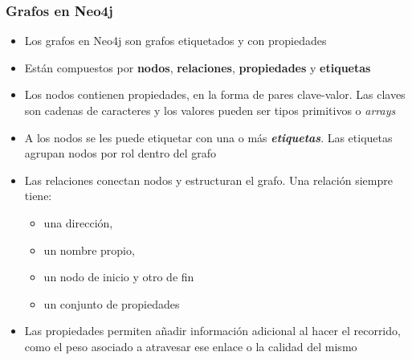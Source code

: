 \documentclass[14pt]{beamer}
\begin{document}
\begin{frame}[allowframebreaks]
  \frametitle{Grafos en Neo4j}
  \begin{itemize}
  \item Los grafos en Neo4j son grafos etiquetados y con propiedades
  \item Están compuestos por {\bf nodos}, {\bf relaciones}, {\bf
      propiedades} y {\bf etiquetas}
\item Los nodos contienen propiedades, en la forma de pares clave-valor.
  Las claves son cadenas de caracteres y los valores pueden ser tipos
  primitivos o {\em arrays}
\item A los nodos se les puede etiquetar con una o más {\bfseries\itshape
    etiquetas}. Las etiquetas agrupan nodos por rol dentro del grafo
\item Las relaciones conectan nodos y estructuran el grafo. Una relación
  siempre tiene:
  \begin{itemize}
  \item una dirección,
  \item un nombre propio,
  \item un nodo de inicio y otro de fin
  \item un conjunto de propiedades
  \end{itemize}
\item Las propiedades permiten añadir información adicional al hacer el
  recorrido, como el peso asociado a atravesar ese enlace o la calidad del
  mismo
  \end{itemize}
\end{frame}


\end{document}
